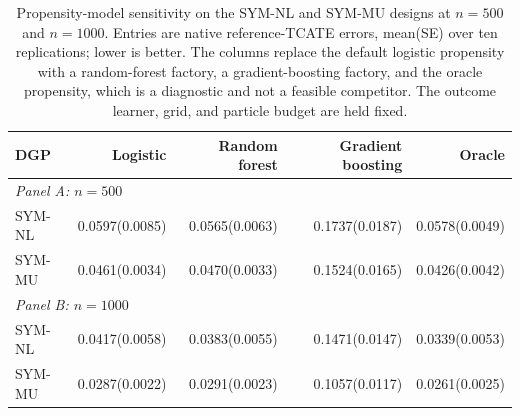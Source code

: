 \begin{table}[t]
\centering
\scriptsize
\setlength{\tabcolsep}{3pt}
\caption{Propensity-model sensitivity on the SYM-NL and SYM-MU designs at $n=500$ and $n=1000$. Entries are native reference-TCATE errors, mean(SE) over ten replications; lower is better. The columns replace the default logistic propensity with a random-forest factory, a gradient-boosting factory, and the oracle propensity, which is a diagnostic and not a feasible competitor. The outcome learner, grid, and particle budget are held fixed.}
\label{tab:sensitivity-propensity}
\begin{tabular}{lrrrr}
\toprule
DGP & Logistic & Random forest & Gradient boosting & Oracle \\
\midrule
\multicolumn{5}{l}{\textit{Panel A: $n=500$}} \\
\midrule
SYM-NL & 0.0597(0.0085) & 0.0565(0.0063) & 0.1737(0.0187) & 0.0578(0.0049) \\
SYM-MU & 0.0461(0.0034) & 0.0470(0.0033) & 0.1524(0.0165) & 0.0426(0.0042) \\
\multicolumn{5}{l}{\textit{Panel B: $n=1000$}} \\
\midrule
SYM-NL & 0.0417(0.0058) & 0.0383(0.0055) & 0.1471(0.0147) & 0.0339(0.0053) \\
SYM-MU & 0.0287(0.0022) & 0.0291(0.0023) & 0.1057(0.0117) & 0.0261(0.0025) \\
\bottomrule
\end{tabular}
\end{table}
